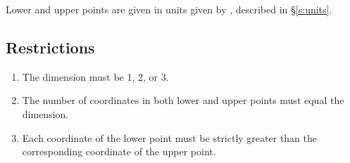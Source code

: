 Lower and upper points are given in units given by ,
described in \S\ref{s:units}.

\subsection{Restrictions}

\begin{enumerate}
\item The dimension must be 1, 2, or 3.
\item The number of coordinates in both lower and upper points must equal the dimension.
\item Each coordinate of the lower point must be strictly greater than the corresponding coordinate of the upper point.
\end{enumerate}



